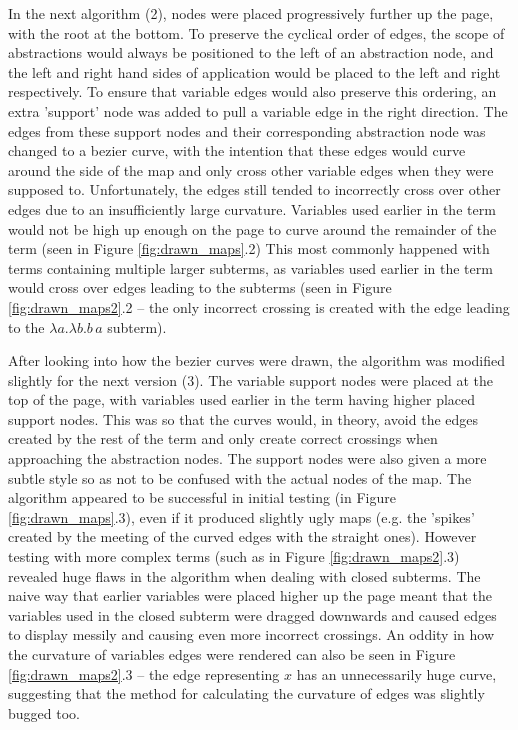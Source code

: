 \documentclass[11pt]{article}
\begin{document}
In the next algorithm (2), nodes were placed progressively further up the page, with the root at the bottom. To preserve the cyclical order of edges, the scope of abstractions would always be positioned to the left of an abstraction node, and the left and right hand sides of application would be placed to the left and right respectively. To ensure that variable edges would also preserve this ordering, an extra 'support' node was added to pull a variable edge in the right direction. The edges from these support nodes and their corresponding abstraction node was changed to a bezier curve, with the intention that these edges would curve around the side of the map and only cross other variable edges when they were supposed to. Unfortunately, the edges still tended to incorrectly cross over other edges due to an insufficiently large curvature. Variables used earlier in the term would not be high up enough on the page to curve around the remainder of the term (seen in Figure \ref{fig:drawn_maps}.2) This most commonly happened with terms containing multiple larger subterms, as variables used earlier in the term would cross over edges leading to the subterms (seen in Figure \ref{fig:drawn_maps2}.2 -- the only incorrect crossing is created with the edge leading to the $\lambda a. \lambda b. b \, a$ subterm).

After looking into how the bezier curves were drawn, the algorithm was modified slightly for the next version (3). The variable support nodes were placed at the top of the page, with variables used earlier in the term having higher placed support nodes. This was so that the curves would, in theory, avoid the edges created by the rest of the term and only create correct crossings when approaching the abstraction nodes. The support nodes were also given a more subtle style so as not to be confused with the actual nodes of the map. The algorithm appeared to be successful in initial testing (in Figure \ref{fig:drawn_maps}.3), even if it produced slightly ugly maps (e.g. the 'spikes' created by the meeting of the curved edges with the straight ones). However testing with more complex terms (such as in Figure \ref{fig:drawn_maps2}.3) revealed huge flaws in the algorithm when dealing with closed subterms. The naive way that earlier variables were placed higher up the page meant that the variables used in the closed subterm were dragged downwards and caused edges to display messily and causing even more incorrect crossings. An oddity in how the curvature of variables edges were rendered can also be seen in Figure \ref{fig:drawn_maps2}.3 -- the edge representing $x$ has an unnecessarily huge curve, suggesting that the method for calculating the curvature of edges was slightly bugged too.
\end{document}
